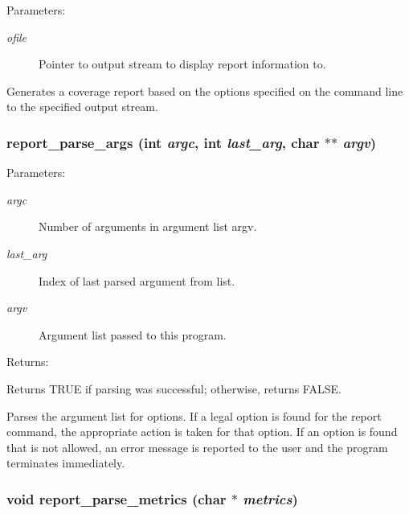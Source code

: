 \begin{Desc}
\item[Parameters: ]\par
\begin{description}
\item[{\em 
ofile}]Pointer to output stream to display report information to.\end{description}
\end{Desc}
Generates a coverage report based on the options specified on the command line to the specified output stream. 
\subsubsection{ report\_\-parse\_\-args (int {\em argc}, int {\em last\_\-arg}, char $\ast$$\ast$ {\em argv})}\label{report_8c_a11}


\begin{Desc}
\item[Parameters: ]\par
\begin{description}
\item[{\em 
argc}]Number of arguments in argument list argv. \item[{\em 
last\_\-arg}]Index of last parsed argument from list. \item[{\em 
argv}]Argument list passed to this program.\end{description}
\end{Desc}
\begin{Desc}
\item[Returns: ]\par
Returns TRUE if parsing was successful; otherwise, returns FALSE.\end{Desc}
Parses the argument list for options. If a legal option is found for the report command, the appropriate action is taken for that option. If an option is found that is not allowed, an error message is reported to the user and the program terminates immediately. 
\subsubsection{\setlength{\rightskip}{0pt plus 5cm}void report\_\-parse\_\-metrics (char $\ast$ {\em metrics})}\label{report_8c_a10}


